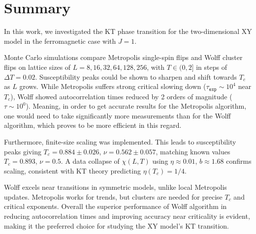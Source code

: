 \section{Summary}
In this work, we investigated the KT phase transition for the two-dimensional XY model in the ferromagnetic case with $J=1$.
\par
Monte Carlo simulations compare Metropolis single-spin flips and Wolff cluster flips on lattice sizes of $L={8,16,32,64,128,256}$, with $T \in (0, 2]$ in steps of $\Delta T = 0.02$.
Susceptibility peaks could be shown to sharpen and shift towards $T_c$ as $L$ grows.
While Metropolis suffers strong critical slowing down ($\tau_{\texttt{exp}} \sim 10^4$ near $T_c$), Wolff showed autocorrelation times reduced by 2 orders of magnitude ($\tau \sim 10^0$).
Meaning, in order to get accurate results for the Metropolis algorithm, one would need to take significantly more measurements than for the Wolff algorithm, which proves to be more efficient in this regard.
\par
Furthermore, finite-size scaling was implemented. This leads to susceptibility peaks giving $T_c = 0.884 \pm 0.026$, $\nu = 0.562 \pm 0.057$, matching known values $T_c = 0.893$, $\nu=0.5$.
A data collapse of $\chi(L,T)$ using $\eta \approx 0.01$, $b \approx 1.68$ confirms scaling, consistent with KT theory predicting $\eta(T_c)=1/4$.
\par
Wolff excels near transitions in symmetric models, unlike local Metropolis updates.
Metropolis works for trends, but clusters are needed for precise $T_c$ and critical exponents.
Overall the superior performance of Wolff algorithm in reducing autocorrelation times and improving accuracy near criticality is evident, making it the preferred choice for studying the XY model's KT transition.
